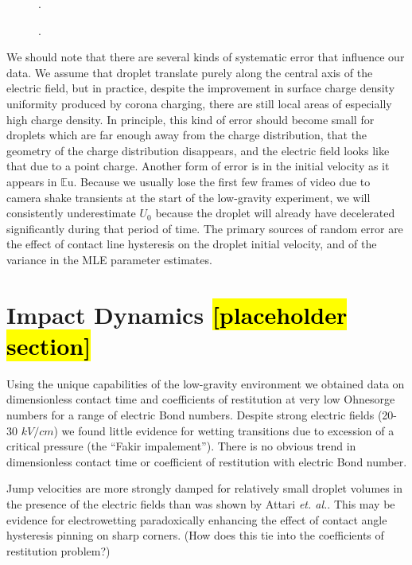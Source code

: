 \documentclass[10pt,a4paper]{article}
\begin{document}
\begin{figure}[htb]
    \centering
    
    \caption{.\label{fig:dnumbs}}
\end{figure}
\begin{figure}[htb]
    \centering
    
    \caption{.\label{fig:dnumbs}}
\end{figure}
We should note that there are several kinds of systematic error that influence our data. We assume that droplet translate purely along the central axis of the electric field, but in practice, despite the improvement in surface charge density uniformity produced by corona charging, there are still local areas of especially high charge density. In principle, this kind of error should become small for droplets which are far enough away from the charge distribution, that the geometry of the charge distribution disappears, and the electric field looks like that due to a point charge. Another form of error is in the initial velocity as it appears in $\mathbb{E}\mbox{u}$. Because we usually lose the first few frames of video due to camera shake transients at the start of the low-gravity experiment, we will consistently underestimate $U_0$ because the droplet will already have decelerated significantly during that period of time. The primary sources of random error are the effect of contact line hysteresis on the droplet initial velocity, and of the variance in the MLE parameter estimates.
\newpage

\section{Impact Dynamics \hl{[placeholder section]}}
Using the unique capabilities of the low-gravity environment we obtained data on dimensionless contact time and coefficients of restitution at very low Ohnesorge numbers for a range of electric Bond numbers. Despite strong electric fields (20-30 $kV/cm$) we found little evidence for wetting transitions due to excession of a critical pressure (the ``Fakir impalement''). There is no obvious trend in dimensionless contact time or coefficient of restitution with electric Bond number.

Jump velocities are more strongly damped for relatively small droplet volumes in the presence of the electric fields than was shown by Attari \emph{et. al.}. This may be evidence for electrowetting paradoxically enhancing the effect of contact angle hysteresis pinning on sharp corners. (How does this tie into the coefficients of restitution problem?)
\end{document}
